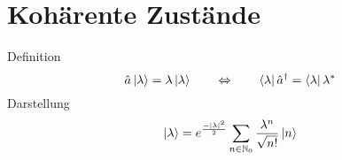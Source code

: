 \section{Kohärente Zustände}

Definition \cite[Glg. 4.95, 4.97]{qm}
\begin{equation*}
    \hat{a}\ket{\lambda}=\lambda\ket{\lambda} \qquad \Leftrightarrow \qquad \bra{\lambda}\hat{a}^\dagger=\bra{\lambda}\lambda^*
\end{equation*}
Darstellung \cite[Glg. 4.96]{qm}
\begin{equation*}
    \ket{\lambda} = e^{\frac{-|\lambda|^2}{2}} \sum_{n\in\mathbb{N}_0}\frac{\lambda^n}{\sqrt{n!}}\ket{n}
\end{equation*}
